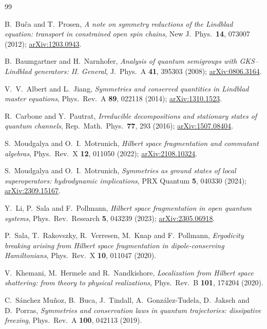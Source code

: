 \documentclass[11pt]{article}
\theoremstyle{plain}
\theoremstyle{definition}
\theoremstyle{remark}
\begin{document}
\begin{thebibliography}{99}

 B.~Bu\v{c}a and T.~Prosen,
\emph{A note on symmetry reductions of the Lindblad equation: transport in
constrained open spin chains},
New J.\ Phys.\ \textbf{14}, 073007 (2012);
\href{https://arxiv.org/abs/1203.0943}{arXiv:1203.0943}.

 B.~Baumgartner and H.~Narnhofer,
\emph{Analysis of quantum semigroups with GKS--Lindblad generators: II.
General},
J.\ Phys.\ A \textbf{41}, 395303 (2008);
\href{https://arxiv.org/abs/0806.3164}{arXiv:0806.3164}.

 V.~V.~Albert and L.~Jiang,
\emph{Symmetries and conserved quantities in Lindblad master equations},
Phys.\ Rev.\ A \textbf{89}, 022118 (2014);
\href{https://arxiv.org/abs/1310.1523}{arXiv:1310.1523}.

 R.~Carbone and Y.~Pautrat,
\emph{Irreducible decompositions and stationary states of quantum channels},
Rep.\ Math.\ Phys.\ \textbf{77}, 293 (2016);
\href{https://arxiv.org/abs/1507.08404}{arXiv:1507.08404}.

 S.~Moudgalya and O.~I.~Motrunich,
\emph{Hilbert space fragmentation and commutant algebras},
Phys.\ Rev.\ X \textbf{12}, 011050 (2022);
\href{https://arxiv.org/abs/2108.10324}{arXiv:2108.10324}.

 S.~Moudgalya and O.~I.~Motrunich,
\emph{Symmetries as ground states of local superoperators: hydrodynamic
implications},
PRX Quantum \textbf{5}, 040330 (2024);
\href{https://arxiv.org/abs/2309.15167}{arXiv:2309.15167}.

 Y.~Li, P.~Sala and F.~Pollmann,
\emph{Hilbert space fragmentation in open quantum systems},
Phys.\ Rev.\ Research \textbf{5}, 043239 (2023);
\href{https://arxiv.org/abs/2305.06918}{arXiv:2305.06918}.

 P.~Sala, T.~Rakovszky, R.~Verresen, M.~Knap and F.~Pollmann,
\emph{Ergodicity breaking arising from Hilbert space fragmentation in
dipole-conserving Hamiltonians},
Phys.\ Rev.\ X \textbf{10}, 011047 (2020).

 V.~Khemani, M.~Hermele and R.~Nandkishore,
\emph{Localization from Hilbert space shattering: from theory to physical
realizations},
Phys.\ Rev.\ B \textbf{101}, 174204 (2020).

 C.~S\'anchez Mu\~noz, B.~Buca, J.~Tindall,
A.~Gonz\'alez-Tudela, D.~Jaksch and D.~Porras,
\emph{Symmetries and conservation laws in quantum trajectories: dissipative
freezing},
Phys.\ Rev.\ A \textbf{100}, 042113 (2019).


\end{thebibliography}
\end{document}
